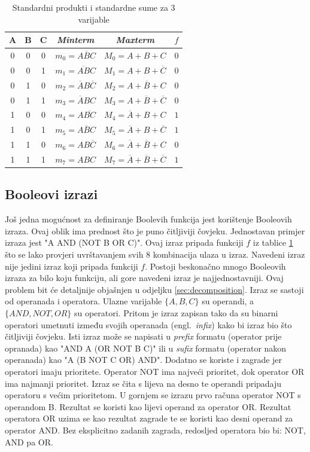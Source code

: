 \documentclass[times, utf8, diplomski]{fer}
\begin{document}
\begin{table}[htb]
	\centering
	\caption{Standardni produkti i standardne sume za $3$ varijable}
	\label{tab:minterms}
	\setlength{\tabcolsep}{12pt}
	\begin{tabular}{|ccc|c|c|c|}
		\hline
		A & B & C & \textit{Minterm} 					& \textit{Maxterm} 									& $f$ \\
		\hline
		0 & 0 & 0 & $m_{0}=\overline{ABC}$ 				& $M_{0}=A+B+C$ 									& $0$ \\
		0 & 0 & 1 & $m_{1}=\overline{AB}C$ 				& $M_{1}=A+B+\overline{C}$ 							& $0$ \\
		0 & 1 & 0 & $m_{2}=\overline{A}B\overline{C}$ 	& $M_{2}=A+\overline{B}+C$ 							& $0$ \\
		0 & 1 & 1 & $m_{3}=\overline{A}BC$ 				& $M_{3}=A+\overline{B}+\overline{C}$ 				& $0$ \\
		1 & 0 & 0 & $m_{4}=A\overline{BC}$ 				& $M_{4}=\overline{A}+B+C$ 							& $1$ \\
		1 & 0 & 1 & $m_{5}=A\overline{B}C$ 				& $M_{5}=\overline{A}+B+\overline{C}$ 				& $1$ \\
		1 & 1 & 0 & $m_{6}=AB\overline{C}$ 				& $M_{6}=\overline{A}+\overline{B}+C$ 				& $0$ \\
		1 & 1 & 1 & $m_{7}=ABC$ 						& $M_{7}=\overline{A}+\overline{B}+\overline{C}$ 	& $1$ \\
		\hline
	\end{tabular}
\end{table}

\subsection{Booleovi izrazi}

Još jedna mogućnost za definiranje Boolevih funkcija jest korištenje Booleovih izraza. Ovaj oblik ima prednost što je puno čitljiviji čovjeku. Jednostavan primjer izraza jest "A AND (NOT B OR C)". Ovaj izraz pripada funkciji $f$ iz tablice \ref{tab:minterms} što se lako provjeri uvrštavanjem svih $8$ kombinacija ulaza u izraz. Navedeni izraz nije jedini izraz koji pripada funkciji $f$. Postoji beskonačno mnogo Booleovih izraza za bilo koju funkciju, ali gore navedeni izraz je najjednostavniji. Ovaj problem bit će detaljnije objašnjen u odjeljku \ref{sec:decomposition}. Izraz se sastoji od operanada i operatora. Ulazne varijable $\{A, B, C\}$ su operandi, a $\{AND, NOT, OR\}$ su operatori. Pritom je izraz zapisan tako da su binarni operatori umetnuti između svojih operanada (engl.~\textit{infix}) kako bi izraz bio što čitljiviji čovjeku. Isti izraz može se napisati u \textit{prefix} formatu (operator prije opranada) kao "AND A (OR NOT B C)" ili u \textit{sufix} formatu (operator nakon operanada) kao "A (B NOT C OR) AND". Dodatno se koriste i zagrade jer operatori imaju prioritete. Operator NOT ima najveći prioritet, dok operator OR ima najmanji prioritet. Izraz se čita s lijeva na desno te operandi pripadaju operatoru s većim prioritetom. U gornjem se izrazu prvo računa operator NOT s operandom B. Rezultat se koristi kao lijevi operand za operator OR. Rezultat operatora OR uzima se kao rezultat zagrade te se koristi kao desni operand za operator AND. Bez eksplicitno zadanih zagrada, redosljed operatora bio bi: NOT, AND pa OR.
\end{document}

